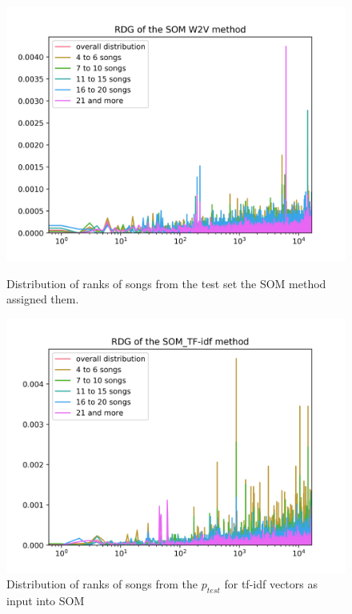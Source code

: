\begin{figure}[h]
\centering
\begin{minipage}{.5\textwidth}
  \centering
  	\includegraphics[width=1\linewidth]{./img/som_w2v_graph.png}
	\caption{Distribution of ranks of songs from the test set the SOM method assigned them.}
	\label{fig:som_distribution}
\end{minipage}%
\begin{minipage}{.5\textwidth}
  \centering
  \includegraphics[width=1\linewidth]{./img/som_tf_idf_graph.png}
  \caption{Distribution of ranks of songs from the $p_{test}$ for tf-idf vectors as input into SOM}
  \label{fig:som_tf_idf_distribution}
\end{minipage}
\end{figure}

